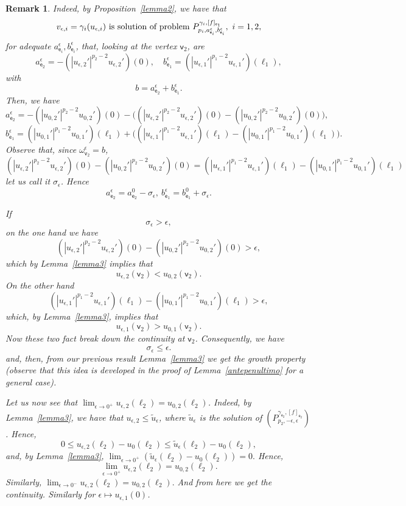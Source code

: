 \documentclass[reqno,12pt]{amsart}
\newtheorem{remark}[theorem]{Remark}
\def\e{\mathsf{e}} 	%
\def\v{\mathsf{v}}	%
\numberwithin{equation}{section} %
\begin{document}
\begin{remark}
   
Indeed, by Proposition~\ref{lemma2}, we have that
$$v_{\epsilon,i}=\gamma_{i}(u_{\epsilon,i}) \ \hbox{is solution of problem} \ P^{\gamma_i, [f]_{\e_1}}_{ p_i, a_{\e_i}^\epsilon,b_{\e_i}^\epsilon} , \ i= 1,2,$$  for adequate $a_{\e_i}^\epsilon,b_{\e_i}^\epsilon$,  that,   looking at the vertex $\v_2$, are
$$  a_{\e_2}^\epsilon= -(|u_{\epsilon,2}'|^{p_2-2}u_{\epsilon,2}')(0), \quad  b_{\e_1}^\epsilon= (|u_{\epsilon,1}'|^{p_1-2}u_{\epsilon,1}')(\ell_{1}),$$ with 
$$b=a_{\e_2}^\epsilon+b_{\e_1}^\epsilon.$$
 Then, we have
$$a_{\e_2}^\epsilon= -(|u_{0,2}'|^{p_{2}-2}u_{0,2}')(0) -\Big((|u_{\epsilon,2}'|^{p_{2}-2}u_{\epsilon,2}')(0)
 -(|u_{0,2}'|^{p_{2}-2}u_{0,2}')(0) \Big),$$
$$b_{\e_1}^\epsilon= (|u_{0,1}'|^{p_{1}-2}u_{0,1}')(\ell_{1}) +\Big((|u_{\epsilon,1}'|^{p_{1}-2}u_{\epsilon,1}')(\ell_{1})- (|u_{0,1}'|^{p_{1}-2}u_{0,1}')(\ell_{1}) \Big).$$
Observe that, since $\omega^\epsilon_{\v_2}=b$,
$$(|u_{\epsilon,2}'|^{p_{2}-2}u_{\epsilon,2}')(0)
 -(|u_{0,2}'|^{p_{2}-2}u_{0,2}')(0) =(|u_{\epsilon,1}'|^{p_{1}-2}u_{\epsilon,1}')(\ell_{1})- (|u_{0,1}'|^{p_{1}-2}u_{0,1}')(\ell_{1})$$ let us call it $\sigma_\epsilon$.
Hence  
$$a_{\e_2}^\epsilon=a_{\e_2}^0-\sigma_\epsilon,\ b_{\e_1}^\epsilon=b_{\e_1}^0+\sigma_\epsilon.$$

If $$\sigma_\epsilon >\epsilon,$$ on the one hand we have
$$(|u_{\epsilon,2}'|^{p_{2}-2}u_{\epsilon,2}')(0)
 -(|u_{0,2}'|^{p_{2}-2}u_{0,2}')(0) > \epsilon,$$
 which by Lemma~\ref{lemma3} implies that
 $$ u_{\epsilon,2}(\v_2) <u_{0,2}(\v_2).$$
 On the other hand
 $$(|u_{\epsilon,1}'|^{p_{1}-2}u_{\epsilon,1}')(\ell_{1})- (|u_{0,1}'|^{p_{1}-2}u_{0,1}')(\ell_{1}) > \epsilon,$$
  which, by Lemma~\ref{lemma3}, implies that
$$ u_{\epsilon,1}(\v_2) > u_{0,1}(\v_2).$$
Now these two fact  break down the continuity at $\v_2$. Consequently, we have $$\sigma_\epsilon\le\epsilon.$$
and, then, from our previous result Lemma~\ref{lemma3} we get the growth property  (observe that this idea is developed in the proof of Lemma~\ref{antepenultimo} for a general case). 


 
 
Let us now see that $\displaystyle\lim_{\epsilon\to 0^+}u_{\epsilon,2}(\ell_2)=u_{0,2}(\ell_2)$.
Indeed, by Lemma~\ref{lemma3},  we have that $u_{\epsilon,2} \le \widetilde u_\epsilon$, where $ \widetilde u_\epsilon$ is the solution of $(P_{p_2,-\epsilon,\epsilon}^{\gamma_{\e_2},[f]_{\e_2}})$. Hence,
$$0\le u_{\epsilon,2}(\ell_2)-u_0(\ell_2)\le \widetilde u_\epsilon(\ell_2)-u_0(\ell_2),$$
and, by Lemma~\ref{lemma3}, $\displaystyle\lim_{\epsilon\to 0^+}\left( \widetilde u_\epsilon(\ell_2) -u_0(\ell_2)\right)=0.$ Hence, $$\displaystyle\lim_{\epsilon\to 0^+}u_{\epsilon,2}(\ell_2)=u_{0,2}(\ell_2).$$
Similarly, $\displaystyle\lim_{\epsilon\to 0^-}u_{\epsilon,2}(\ell_2)=u_{0,2}(\ell_2).$
And from here we get the continuity. Similarly for $\epsilon\mapsto u_{\epsilon,1}(0)$. 
 


\end{remark}
\end{document}
